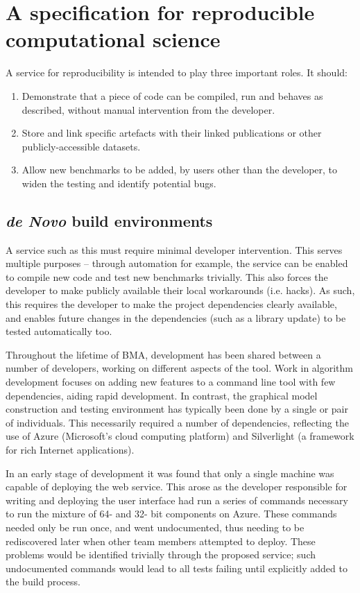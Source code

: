 \documentclass[conference]{IEEEtran}
\begin{document}
\section{A specification for reproducible computational science}\label{spec}

A service for reproducibility is intended to play three important
roles. It should:

\begin{enumerate}
\item Demonstrate that a piece of code can be compiled, run
and behaves as described, without manual intervention from the
developer.
\item Store and link specific artefacts with their linked
publications or other publicly-accessible datasets.
\item Allow new benchmarks to be added, by users other than
the developer, to widen the testing and identify potential bugs.
\end{enumerate}

\subsection{{\em de Novo} build environments}

A service such as this must require minimal developer intervention.
This serves multiple purposes -- through automation for example, the
service can be enabled to compile new code and test new benchmarks
trivially. This also forces the developer to make publicly available
their local workarounds (i.e. hacks). As such, this requires the
developer to make the project dependencies clearly available, and
enables future changes in the dependencies (such as a library update)
to be tested automatically too.

Throughout the lifetime of BMA, development has been shared between a
number of developers, working on different aspects of the tool. Work
in algorithm development focuses on adding new features to a command
line tool with few dependencies, aiding rapid development. In
contrast, the graphical model construction and testing environment has
typically been done by a single or pair of individuals.  This
necessarily required a number of dependencies, reflecting the use of
Azure (Microsoft's cloud computing platform) and Silverlight (a
framework for rich Internet applications).

In an early stage of development it was found that only a single
machine was capable of deploying the web service. This arose as the
developer responsible for writing and deploying the user interface had
run a series of commands necessary to run the mixture of 64- and 32-
bit components on Azure. These commands needed only be run once, and
went undocumented, thus needing to be rediscovered later when other
team members attempted to deploy.  These problems would be identified
trivially through the proposed service; such undocumented commands
would lead to all tests failing until explicitly added to the build
process.
\end{document}
